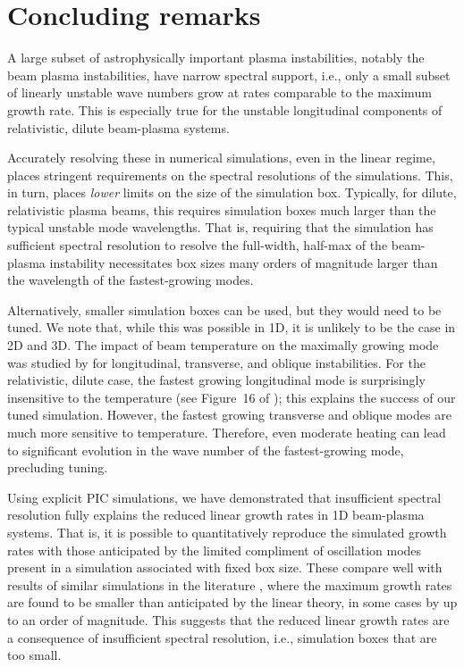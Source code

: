 \documentclass[pop,numberedappendix,iop]{aeb_emulateapj_2015}
\begin{document}
\section{Concluding remarks}
\label{sec:conclusion}

A large subset of astrophysically important plasma instabilities, notably the beam plasma instabilities, have narrow spectral support, i.e., only a small subset of linearly unstable wave numbers grow at rates comparable to the maximum growth rate.
This is especially true for the unstable longitudinal components  of relativistic, dilute beam-plasma systems.

Accurately resolving these in numerical simulations, even in the linear regime, places stringent requirements on the spectral resolutions of the simulations.
This, in turn, places {\it lower} limits on the size of the simulation box.
Typically, for dilute, relativistic plasma beams, this requires simulation boxes much larger than the typical unstable mode wavelengths.
That is, requiring that the simulation has sufficient spectral resolution to resolve the full-width, half-max of the beam-plasma instability necessitates box sizes many orders of magnitude larger than the wavelength of the fastest-growing modes.  


Alternatively, smaller simulation boxes can be used, but they would need to be tuned. We note that, while this was possible in 1D, it is unlikely to be the case in 2D and 3D.
The impact of beam temperature on the maximally growing mode was studied by \citet{Bret-2010-tp} for longitudinal, transverse, and oblique instabilities.
For the relativistic, dilute case, the fastest growing longitudinal mode is surprisingly insensitive to the temperature (see Figure~16 of \citealt{Bret-2010-tp}); this explains the success of our tuned simulation.
However, the fastest growing transverse and oblique modes are much more sensitive to temperature.
Therefore, even moderate heating can lead to significant evolution in the wave number of the fastest-growing mode, precluding tuning.


Using explicit PIC simulations, we have demonstrated that insufficient spectral resolution fully explains the reduced linear growth rates in 1D beam-plasma systems.
That is, it is possible to quantitatively reproduce the simulated growth rates with those anticipated by the limited compliment of oscillation modes present in a simulation associated with fixed box size.
These compare well with results of similar simulations in the literature \citep[see, e.g.,][]{gremillet2007,Bret2010,lorenzo2014,kempf2016, Rafighi2017}, where the maximum growth rates are found to be smaller than anticipated by the linear theory, in some cases by up to an order of magnitude.
This suggests that the reduced linear growth rates are a consequence of insufficient spectral resolution, i.e., simulation boxes that are too small.
   
\end{document}
